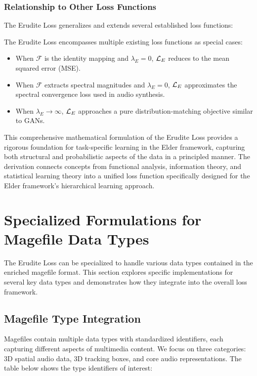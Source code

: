 \subsubsection{Relationship to Other Loss Functions}

The Erudite Loss generalizes and extends several established loss functions:

\begin{proposition}
The Erudite Loss encompasses multiple existing loss functions as special cases:
\begin{itemize}
\item When $\mathcal{F}$ is the identity mapping and $\lambda_E = 0$, $\mathcal{L}_E$ reduces to the mean squared error (MSE).
\item When $\mathcal{F}$ extracts spectral magnitudes and $\lambda_E = 0$, $\mathcal{L}_E$ approximates the spectral convergence loss used in audio synthesis.
\item When $\lambda_E \to \infty$, $\mathcal{L}_E$ approaches a pure distribution-matching objective similar to GANs.
\end{itemize}
\end{proposition}

This comprehensive mathematical formulation of the Erudite Loss provides a rigorous foundation for task-specific learning in the Elder framework, capturing both structural and probabilistic aspects of the data in a principled manner. The derivation connects concepts from functional analysis, information theory, and statistical learning theory into a unified loss function specifically designed for the Elder framework's hierarchical learning approach.

\section{Specialized Formulations for Magefile Data Types}

The Erudite Loss can be specialized to handle various data types contained in the enriched magefile format. This section explores specific implementations for several key data types and demonstrates how they integrate into the overall loss framework.

\subsection{Magefile Type Integration}

Magefiles contain multiple data types with standardized identifiers, each capturing different aspects of multimedia content. We focus on three categories: 3D spatial audio data, 3D tracking boxes, and core audio representations. The table below shows the type identifiers of interest:

